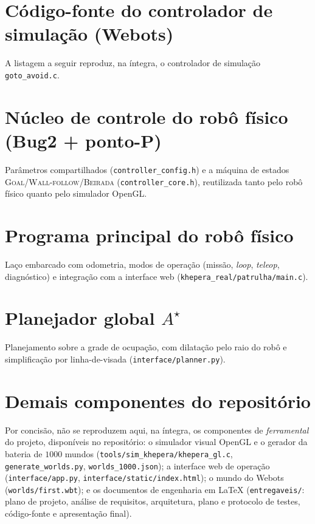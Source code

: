 \documentclass[11pt,a4paper]{article}
\begin{document}
\appendix
\section{Código-fonte do controlador de simulação (Webots)}\label{ap:codigo}
A listagem a seguir reproduz, na íntegra, o controlador de simulação \texttt{goto\_avoid.c}.


\section{Núcleo de controle do robô físico (Bug2 + ponto-P)}\label{ap:core}
Parâmetros compartilhados (\texttt{controller\_config.h}) e a máquina de estados \textsc{Goal}/\textsc{Wall-follow}/\textsc{Beirada} (\texttt{controller\_core.h}), reutilizada tanto pelo robô físico quanto pelo simulador OpenGL.



\section{Programa principal do robô físico}\label{ap:main}
Laço embarcado com odometria, modos de operação (missão, \emph{loop}, \emph{teleop}, diagnóstico) e integração com a interface web (\texttt{khepera\_real/patrulha/main.c}).


\section{Planejador global $A^\star$}\label{ap:planner}
Planejamento sobre a grade de ocupação, com dilatação pelo raio do robô e simplificação por linha-de-visada (\texttt{interface/planner.py}).


\section{Demais componentes do repositório}\label{ap:repo}
Por concisão, não se reproduzem aqui, na íntegra, os componentes de \emph{ferramental} do projeto, disponíveis no repositório: o simulador visual OpenGL e o gerador da bateria de $1000$ mundos (\texttt{tools/sim\_khepera/khepera\_gl.c}, \texttt{generate\_worlds.py}, \texttt{worlds\_1000.json}); a interface web de operação (\texttt{interface/app.py}, \texttt{interface/static/index.html}); o mundo do Webots (\texttt{worlds/first.wbt}); e os documentos de engenharia em \LaTeX{} (\texttt{entregaveis/}: plano de projeto, análise de requisitos, arquitetura, plano e protocolo de testes, código-fonte e apresentação final).
\end{document}
